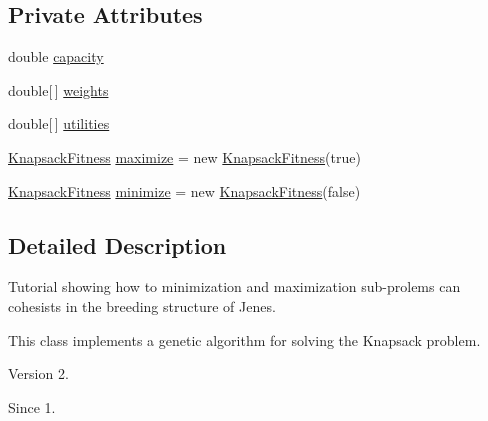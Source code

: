 \subsection*{Private Attributes}
\begin{DoxyCompactItemize}
\item 
double \hyperlink{classjenes_1_1tutorials_1_1problem6_1_1_knapsack_g_a_ab169e26ab1954615b1469cfada76bd52}{capacity}
\item 
double\mbox{[}$\,$\mbox{]} \hyperlink{classjenes_1_1tutorials_1_1problem6_1_1_knapsack_g_a_afe0b0b55dd92cf81368115a9385aae05}{weights}
\item 
double\mbox{[}$\,$\mbox{]} \hyperlink{classjenes_1_1tutorials_1_1problem6_1_1_knapsack_g_a_ae651e8e0a6b9bdd61515da9f2689f3f5}{utilities}
\item 
\hyperlink{classjenes_1_1tutorials_1_1problem6_1_1_knapsack_g_a_1_1_knapsack_fitness}{Knapsack\-Fitness} \hyperlink{classjenes_1_1tutorials_1_1problem6_1_1_knapsack_g_a_a09a22aca6ce24e19e04329f4e05be4fb}{maximize} = new \hyperlink{classjenes_1_1tutorials_1_1problem6_1_1_knapsack_g_a_1_1_knapsack_fitness}{Knapsack\-Fitness}(true)
\item 
\hyperlink{classjenes_1_1tutorials_1_1problem6_1_1_knapsack_g_a_1_1_knapsack_fitness}{Knapsack\-Fitness} \hyperlink{classjenes_1_1tutorials_1_1problem6_1_1_knapsack_g_a_a9c92187484cd48309f61e2bdf37ab0be}{minimize} = new \hyperlink{classjenes_1_1tutorials_1_1problem6_1_1_knapsack_g_a_1_1_knapsack_fitness}{Knapsack\-Fitness}(false)
\end{DoxyCompactItemize}


\subsection{Detailed Description}
Tutorial showing how to minimization and maximization sub-\/prolems can cohesists in the breeding structure of Jenes.

This class implements a genetic algorithm for solving the Knapsack problem.

\begin{DoxyVersion}{Version}
2. 
\end{DoxyVersion}
\begin{DoxySince}{Since}
1. 
\end{DoxySince}


